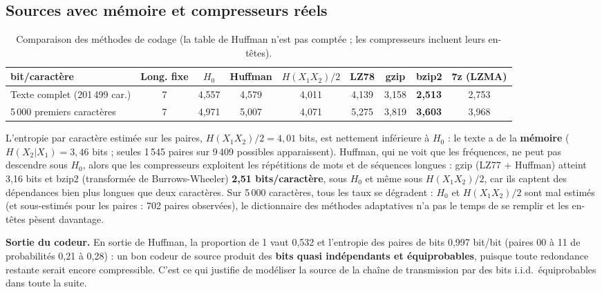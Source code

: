\documentclass[10pt,a4paper]{article}
\begin{document}
\subsection{Sources avec mémoire et compresseurs réels}
\begin{table}[!htb]
\centering\small
\begin{tabular}{lcccccccc}
\toprule
bit/caractère & Long. fixe & $H_0$ & Huffman & $H(X_1X_2)/2$ & LZ78 & gzip & bzip2 & 7z (LZMA) \\
\midrule
Texte complet (201\,499 car.) & 7 & 4,557 & 4,579 & 4,011 & 4,139 & 3,158 & \textbf{2,513} & 2,753 \\
5\,000 premiers caractères   & 7 & 4,971 & 5,007 & 4,071 & 5,275 & 3,819 & \textbf{3,603} & 3,968 \\
\bottomrule
\end{tabular}
\caption{Comparaison des méthodes de codage (la table de Huffman n'est pas comptée ; les compresseurs incluent leurs en-têtes).}
\label{tab:compr}
\end{table}

L'entropie par caractère estimée sur les paires, $H(X_1X_2)/2 = 4,01$ bits, est nettement inférieure à $H_0$ : le texte a de la \textbf{mémoire} ($H(X_2|X_1) = 3,46$ bits ; seules 1\,545 paires sur 9\,409 possibles apparaissent). Huffman, qui ne voit que les fréquences, ne peut pas descendre sous $H_0$, alors que les compresseurs exploitent les répétitions de mots et de séquences longues : gzip (LZ77 + Huffman) atteint 3,16 bits et bzip2 (transformée de Burrows-Wheeler) \textbf{2,51 bits/caractère}, sous $H_0$ et même sous $H(X_1X_2)/2$, car ils captent des dépendances bien plus longues que deux caractères. Sur 5\,000 caractères, tous les taux se dégradent : $H_0$ et $H(X_1X_2)/2$ sont mal estimés (et sous-estimés pour les paires : 702 paires observées), le dictionnaire des méthodes adaptatives n'a pas le temps de se remplir et les en-têtes pèsent davantage.

\textbf{Sortie du codeur.} En sortie de Huffman, la proportion de 1 vaut 0,532 et l'entropie des paires de bits 0,997 bit/bit (paires 00 à 11 de probabilités 0,21 à 0,28) : un bon codeur de source produit des \textbf{bits quasi indépendants et équiprobables}, puisque toute redondance restante serait encore compressible. C'est ce qui justifie de modéliser la source de la chaîne de transmission par des bits i.i.d.\ équiprobables dans toute la suite.
\end{document}
